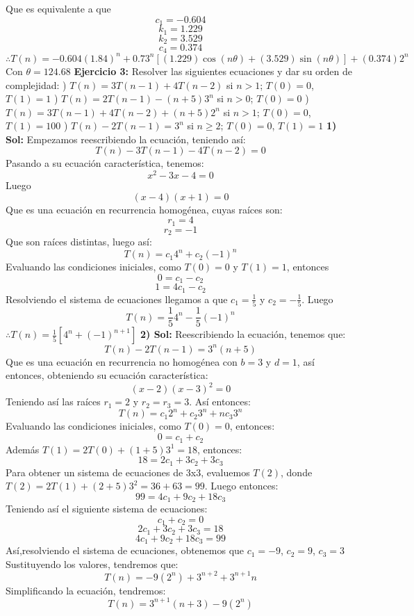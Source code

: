 \documentclass[12pt, letterpaper, oneside]{article}
\begin{document}
Que es equivalente a que
\[c_{1}=-0.604\]
\[k_{1}=1.229\]
\[k_{2}=3.529\]
\[c_{4}=0.374\]
\center
$\therefore T(n) = -0.604(1.84)^{n}+0.73^{n}[(1.229)\cos(n\theta)+(3.529)\sin(n\theta)]+(0.374)2^{n}$
Con $\theta=124.68$
\newpage
\justify
\textbf{Ejercicio 3:} Resolver las siguientes ecuaciones y dar su orden de complejidad:
) $T(n)=3T(n-1)+4T(n-2)$ si $n > 1$; $T(0)=0$, $T(1)=1$
\vspace{10mm}
) $T(n)=2T(n-1)-(n+5)3^{n}$ si $n > 0$; $T(0)=0$
\vspace{10mm}
) $T(n)=3T(n-1)+4T(n-2)+(n+5)2^{n}$ si $n > 1$; $T(0)=0$, $T(1)=100$
\vspace{10mm}
) $T(n)-2T(n-1)=3^{n}$ si $n\geq2$; $T(0)=0$, $T(1)=1$
\newline
\justify
\textbf{1) Sol: } Empezamos reescribiendo la ecuación, teniendo así:
\[T(n)-3T(n-1)-4T(n-2)=0\]
Pasando a su ecuación característica, tenemos:
\[x^{2}-3x-4=0\]
Luego
\[(x-4)(x+1)=0\]
Que es una ecuación en recurrencia homogénea, cuyas raíces son:
\[r_{1}=4\]
\[r_{2}=-1\]
Que son raíces distintas, luego así:
\[T(n)=c_{1}4^{n}+c_{2}(-1)^{n}\]
Evaluando las condiciones iniciales, como $T(0)=0$ y $T(1)=1$, entonces
\[0=c_{1}-c_{2}\]
\[1=4c_{1}-c_{2}\]
Resolviendo el sistema de ecuaciones llegamos a que $c_{1}=\frac{1}{5}$ y $c_{2}=-\frac{1}{5}$.
Luego
\[T(n)=\frac{1}{5}4^{n}-\frac{1}{5}(-1)^{n}\]
\center
$\therefore T(n)=\frac{1}{5}[4^{n}+(-1)^{n+1}]$
\newpage
\justify
\textbf{2) Sol:} Reescribiendo la ecuación, tenemos que:
\[T(n)-2T(n-1)=3^{n}(n+5)\]
Que es una ecuación en recurrencia no homogénea con $b=3$ y $d=1$, así entonces, obteniendo su ecuación característica:
\[(x-2)(x-3)^{2}=0\]
Teniendo así las raíces $r_{1}=2$ y $r_{2}=r_{3}=3$. Así entonces:
\[T(n)=c_{1}2^{n}+c_{2}3^{n}+nc_{3}3^{n}\]
Evaluando las condiciones iniciales, como $T(0)=0$, entonces:
\[0=c_{1}+c_{2}\]
Además $T(1)=2T(0)+(1+5)3^{1}=18$, entonces:
\[18 = 2c_{1}+3c_{2}+3c_{3}\] 
Para obtener un sistema de ecuaciones de 3x3, evaluemos $T(2)$, donde $T(2)=2T(1)+(2+5)3^{2}=36+63=99$. Luego entonces:
\[99 = 4c_{1}+9c_{2}+18c_{3}\]
Teniendo así el siguiente sistema de ecuaciones:
\[c_{1}+c_{2}=0\]
\[2c_{1}+3c_{2}+3c_{3}=18\]
\[4c_{1}+9c_{2}+18c_{3}=99\]
Así,resolviendo el sistema de ecuaciones, obtenemos que 
\center
$c_{1}=-9$, $c_{2}=9$, $c_{3}=3$
\justify
Sustituyendo los valores, tendremos que:
\[T(n)=-9(2^{n})+3^{n+2}+3^{n+1}n\]
Simplificando la ecuación, tendremos:
\[T(n)=3^{n+1}(n+3)-9(2^{n})\]
\end{document}

